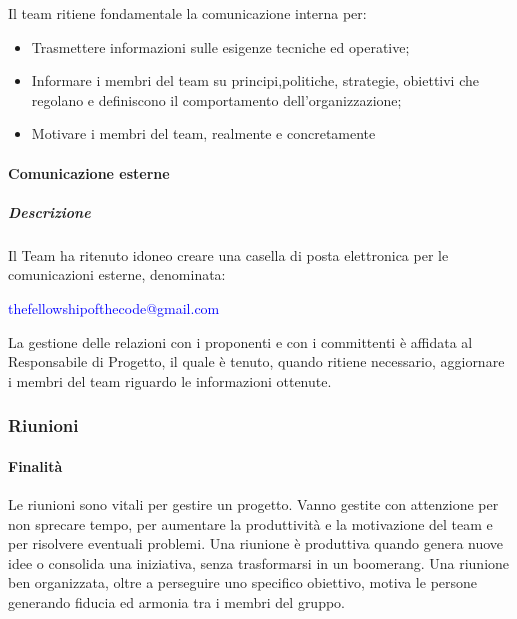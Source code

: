 Il team ritiene fondamentale la comunicazione interna per:
\begin{itemize}
\item
Trasmettere informazioni sulle esigenze tecniche ed operative;
\item
Informare i membri del team su principi,politiche, strategie, obiettivi che regolano e definiscono il comportamento dell'organizzazione;
\item
Motivare i membri del team, realmente e concretamente
\end{itemize}


\paragraph{Comunicazione esterne}
\subparagraph{Descrizione}
Il Team ha ritenuto idoneo creare una casella di posta elettronica per le comunicazioni esterne, denominata:

\begin{center} \textcolor{blue}{thefellowshipofthecode@gmail.com} \end{center}

La gestione delle relazioni con i proponenti e con i committenti è affidata al Responsabile di Progetto, il quale è tenuto, quando ritiene necessario, aggiornare i membri del team riguardo le informazioni ottenute. 


\subsubsection{Riunioni}

\paragraph{Finalità}
Le riunioni sono vitali per gestire un progetto. Vanno gestite con attenzione per non sprecare tempo, per aumentare la produttività e la motivazione del team e per risolvere eventuali problemi. Una riunione è produttiva quando genera nuove idee o consolida una iniziativa, senza trasformarsi in un boomerang.
Una riunione ben organizzata, oltre a perseguire uno specifico obiettivo, motiva le persone generando fiducia ed armonia tra i membri del gruppo.

 

